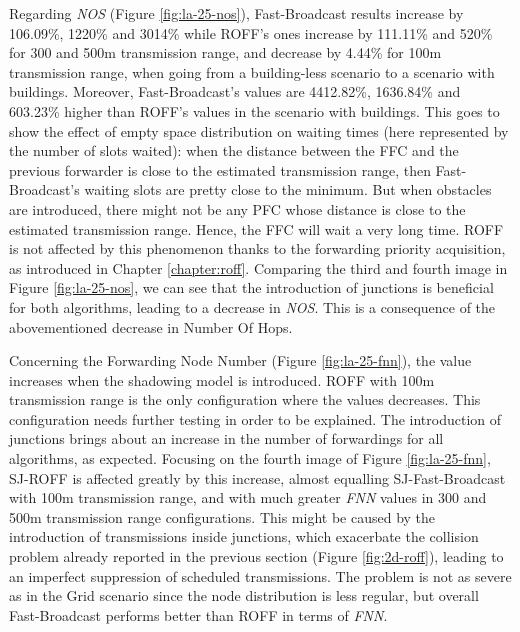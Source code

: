 		
		Regarding \textit{NOS} (Figure \ref{fig:la-25-nos}), Fast-Broadcast results increase by 106.09\%, 1220\% and 3014\% while ROFF's ones increase by 111.11\% and 520\% for 300 and 500m transmission range, and decrease by 4.44\% for 100m transmission range, when going from a building-less scenario to a scenario with buildings. Moreover, Fast-Broadcast's values are 4412.82\%, 1636.84\% and 603.23\% higher than ROFF's values in the scenario with buildings. This goes to show the effect of empty space distribution on waiting times (here represented by the number of slots waited): when the distance between the FFC and the previous forwarder is close to the estimated transmission range, then Fast-Broadcast's waiting slots are pretty close to the minimum. But when obstacles are introduced, there might not be any PFC whose distance is close to the estimated transmission range. Hence, the FFC will wait a very long time. ROFF is not affected by this phenomenon thanks to the forwarding priority acquisition, as introduced in Chapter \ref{chapter:roff}. Comparing the third and fourth image in Figure \ref{fig:la-25-nos}, we can see that the introduction of junctions is beneficial for both algorithms, leading to a decrease in \textit{NOS}. This is a consequence of the abovementioned decrease in Number Of Hops.
			
		Concerning the Forwarding Node Number (Figure \ref{fig:la-25-fnn}), the value increases when the shadowing model is introduced. ROFF with 100m transmission range is the only configuration where the values decreases. This configuration needs further testing in order to be explained.
		The introduction of junctions brings about an increase in the number of forwardings for all algorithms, as expected. Focusing on the fourth image of Figure \ref{fig:la-25-fnn}, SJ-ROFF is affected greatly by this increase, almost equalling SJ-Fast-Broadcast with 100m transmission range, and with much greater \textit{FNN} values in 300 and 500m transmission range configurations. This might be caused by the introduction of transmissions inside junctions, which exacerbate the collision problem already reported in the previous section (Figure \ref{fig:2d-roff}), leading to an imperfect suppression of scheduled transmissions. The problem is not as severe as in the Grid scenario since the node distribution is less regular, but overall Fast-Broadcast performs better than ROFF in terms of \textit{FNN}.
	

